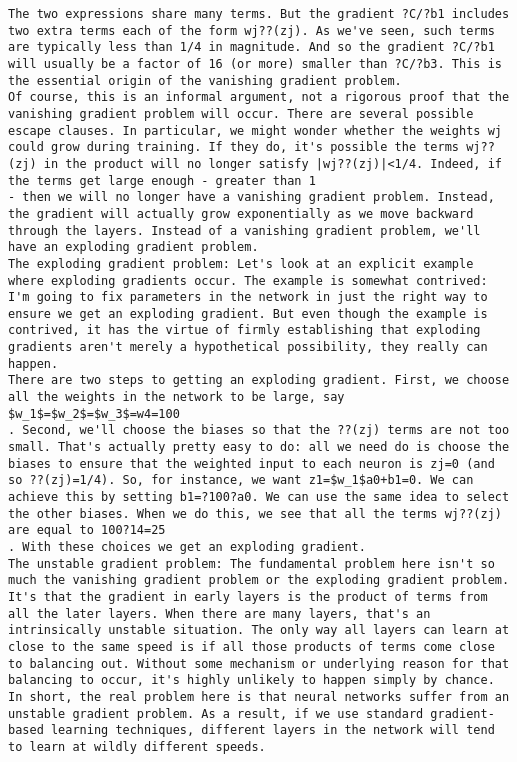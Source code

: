 \begin{lstlisting}
The two expressions share many terms. But the gradient ?C/?b1 includes two extra terms each of the form wj??(zj). As we've seen, such terms are typically less than 1/4 in magnitude. And so the gradient ?C/?b1 will usually be a factor of 16 (or more) smaller than ?C/?b3. This is the essential origin of the vanishing gradient problem.
Of course, this is an informal argument, not a rigorous proof that the vanishing gradient problem will occur. There are several possible escape clauses. In particular, we might wonder whether the weights wj
could grow during training. If they do, it's possible the terms wj??(zj) in the product will no longer satisfy |wj??(zj)|<1/4. Indeed, if the terms get large enough - greater than 1
- then we will no longer have a vanishing gradient problem. Instead, the gradient will actually grow exponentially as we move backward through the layers. Instead of a vanishing gradient problem, we'll have an exploding gradient problem.
The exploding gradient problem: Let's look at an explicit example where exploding gradients occur. The example is somewhat contrived: I'm going to fix parameters in the network in just the right way to ensure we get an exploding gradient. But even though the example is contrived, it has the virtue of firmly establishing that exploding gradients aren't merely a hypothetical possibility, they really can happen.
There are two steps to getting an exploding gradient. First, we choose all the weights in the network to be large, say $w_1$=$w_2$=$w_3$=w4=100
. Second, we'll choose the biases so that the ??(zj) terms are not too small. That's actually pretty easy to do: all we need do is choose the biases to ensure that the weighted input to each neuron is zj=0 (and so ??(zj)=1/4). So, for instance, we want z1=$w_1$a0+b1=0. We can achieve this by setting b1=?100?a0. We can use the same idea to select the other biases. When we do this, we see that all the terms wj??(zj) are equal to 100?14=25
. With these choices we get an exploding gradient.
The unstable gradient problem: The fundamental problem here isn't so much the vanishing gradient problem or the exploding gradient problem. It's that the gradient in early layers is the product of terms from all the later layers. When there are many layers, that's an intrinsically unstable situation. The only way all layers can learn at close to the same speed is if all those products of terms come close to balancing out. Without some mechanism or underlying reason for that balancing to occur, it's highly unlikely to happen simply by chance. In short, the real problem here is that neural networks suffer from an unstable gradient problem. As a result, if we use standard gradient-based learning techniques, different layers in the network will tend to learn at wildly different speeds.

\end{lstlisting}
